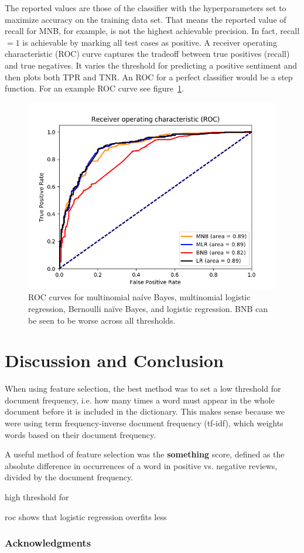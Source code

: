 \documentclass{article} %
\begin{document}
	The reported values are those of the classifier with the hyperparameters set to maximize accuracy on the training data set. That means the reported value of recall for MNB, for example, is not the highest achievable precision. In fact, recall $=1$ is achievable by marking all test cases as positive. A receiver operating characteristic (ROC) curve captures the tradeoff between true positives (recall) and true negatives. It varies the threshold for predicting a positive sentiment and then plots both TPR and TNR. An ROC for a perfect classifier would be a step function. For an example ROC curve see figure~\ref{fig:roc}.
	\begin{figure}[h]
		\centering
		\includegraphics[scale=.5]{ROC}
		\caption{ROC curves for multinomial na\'ive Bayes, multinomial logistic regression, Bernoulli na\"ive Bayes, and logistic regression. BNB can be seen to be worse across all thresholds.}
		\label{fig:roc}
	\end{figure}
		
	\section{Discussion and Conclusion}
	
	When using feature selection, the best method was to set a low threshold for document frequency, i.e. how many times a word must appear in the whole document before it is included in the dictionary. This makes sense because we were using term frequency-inverse document frequency (tf-idf), which weights words based on their document frequency. 
	
	A useful method of feature selection was the {\bf something} score, defined as the absolute difference in occurrences of a word in positive vs. negative reviews, divided by the document frequency. 
	
	high threshold for 
	
	roc shows that logistic regression overfits less
	
	\subsubsection*{Acknowledgments}
	
	
	
	
	
\end{document}
